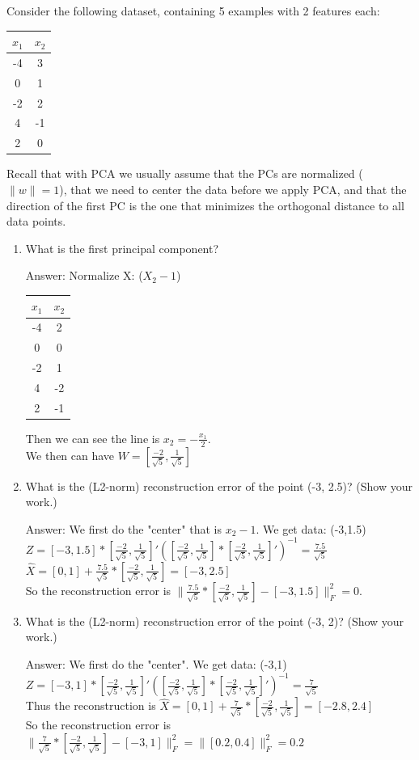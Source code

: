 \documentclass{article}
\def\ans#1{\par\gre{Answer: #1}}
\def\blu#1{{\color{blu}#1}}
\def\gre#1{{\color{gre}#1}}
\def\norm#1{\|#1\|}
\def\enum#1{\begin{enumerate}#1\end{enumerate}}
\begin{document}
Consider the following dataset, containing 5 examples with 2 features each:
\begin{center}
\begin{tabular}{cc}
$x_1$ & $x_2$\\
\hline
-4 & 3\\
0 & 1\\
-2 & 2\\
4 & -1\\
2 & 0\\
\end{tabular}
\end{center}
Recall that with PCA we usually assume that the PCs are normalized ($\norm{w} = 1$), that we need to center the data before we apply PCA, and that the direction of the first PC is the one that minimizes the orthogonal distance to all data points.
\blu{
\enum{
\item What is the first principal component?
\ans{
    Normalize X: ($X_2-1$) \\
    \begin{tabular}{cc}
        $x_1$ & $x_2$\\
        \hline
        -4 & 2\\
        0 & 0\\
        -2 & 1\\
        4 & -2\\
        2 & -1\\
        \end{tabular}
    Then we can see the line is $x_2 = -\frac {x_1} 2$. \\
    We then can have $W = [ \frac {-2} {\sqrt{5}} , \frac{1}{\sqrt{5}}]$
}
\item What is the (L2-norm) reconstruction error of the point (-3, 2.5)? (Show your work.)
\ans{We first do the "center" that is $x_2-1$. We get data: (-3,1.5) \\
   $Z = [-3, 1.5] * [ \frac {-2} {\sqrt{5}} , \frac{1}{\sqrt{5}}]'([ \frac {-2} {\sqrt{5}} , \frac{1}{\sqrt{5}}] * [ \frac {-2} {\sqrt{5}} , \frac{1}{\sqrt{5}}]')^{-1} = \frac{7.5}{\sqrt{5}}$ \\
   $\hat{X} =[0,1] + \frac{7.5}{\sqrt{5}} * [ \frac {-2} {\sqrt{5}} , \frac{1}{\sqrt{5}}] = [-3, 2.5]$\\
   So the reconstruction error is $ \|\frac{7.5}{\sqrt{5}} * [ \frac {-2} {\sqrt{5}} , \frac{1}{\sqrt{5}}] - [-3,1.5]\|_F^2 = 0$.
}
\item What is the (L2-norm) reconstruction error of the point (-3, 2)? (Show your work.)
\ans{
    We first do the "center". We get data: (-3,1) 
    $Z = [-3, 1] * [ \frac {-2} {\sqrt{5}} , \frac{1}{\sqrt{5}}]'([ \frac {-2} {\sqrt{5}} , \frac{1}{\sqrt{5}}] * [ \frac {-2} {\sqrt{5}} , \frac{1}{\sqrt{5}}]')^{-1} = \frac{7}{\sqrt{5}}$ \\
Thus the reconstruction is $\hat{X} =[0,1] + \frac{7}{\sqrt{5}} * [ \frac {-2} {\sqrt{5}} , \frac{1}{\sqrt{5}}] = [-2.8, 2.4]$\\
So the reconstruction error is $ \|\frac{7}{\sqrt{5}} * [ \frac {-2} {\sqrt{5}} , \frac{1}{\sqrt{5}}] - [-3,1]\|_F^2 = \|[0.2, 0.4]\|_F^2 = 0.2$
}
}
}
\end{document}
